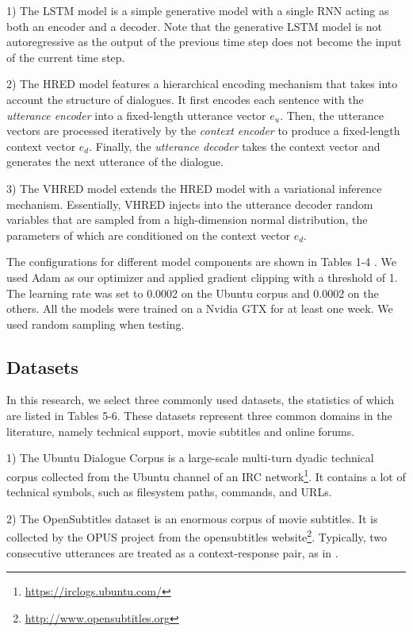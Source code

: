 \documentclass[conference]{IEEEtran}
\begin{document}
1) The LSTM model is a simple generative model with a single RNN acting as both an encoder and a decoder.
Note that the generative LSTM model is not autoregressive as the output of the previous time step does not become the input of the current time step.

2) The HRED model \cite{hred-qs,HRED} features a hierarchical encoding mechanism that takes into account the structure of dialogues.
It first encodes each sentence with the \emph{utterance encoder} into a fixed-length utterance vector $e_u$. Then, the utterance vectors are processed iteratively by the \emph{context encoder} to produce a fixed-length context vector $e_d$.
Finally, the \emph{utterance decoder} takes the context vector and generates the next utterance of the dialogue.

3) The VHRED model \cite{VHRED} extends the HRED model with a variational inference mechanism.
Essentially, VHRED injects into the utterance decoder random variables that are sampled from a high-dimension normal distribution, the parameters of which are conditioned on the context vector $e_d$.

The configurations for different model components are shown in Tables 1-4 .
We used Adam \cite{AdamOpt} as our optimizer and applied gradient clipping with a threshold of 1.
The learning rate was set to 0.0002 on the Ubuntu corpus and 0.0002 on the others.
All the models were trained on a Nvidia GTX for at least one week.
We used random sampling when testing.


\subsection{Datasets}
In this research, we select three commonly used datasets, the statistics of which are listed in Tables 5-6.
These datasets represent three common domains in the literature, namely technical support, movie subtitles and online forums.


1) The Ubuntu Dialogue Corpus \cite{ubuntu_corpus} is a large-scale multi-turn dyadic technical corpus collected from the Ubuntu channel of an IRC network\footnote{\url{https://irclogs.ubuntu.com/}}.
It contains a lot of technical symbols, such as filesystem paths, commands, and URLs.

2) The OpenSubtitles dataset \cite{opensub} is an enormous corpus of movie subtitles.
It is collected by the OPUS project \cite{OPUS} from the opensubtitles website\footnote{\url{http://www.opensubtitles.org}}.
Typically, two consecutive utterances are treated as a context-response pair, as in \cite{GoogleChatbot,MMI}.
\end{document}
